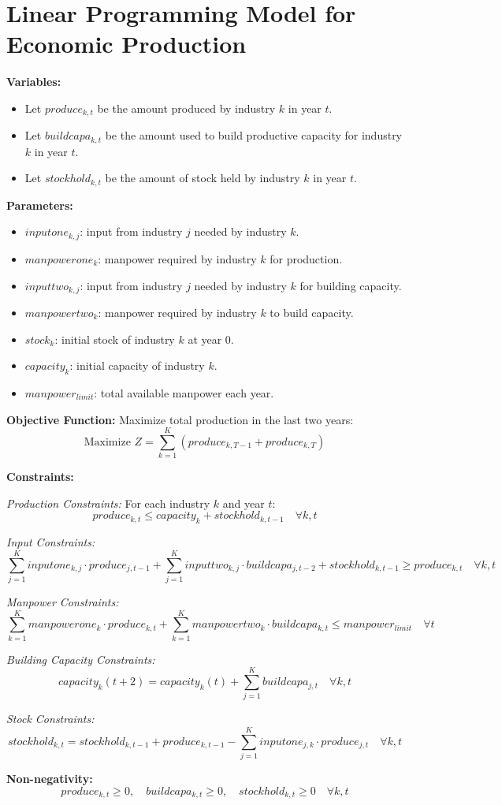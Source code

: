 \documentclass{article}
\begin{document}
\section*{Linear Programming Model for Economic Production}

\textbf{Variables:}
\begin{itemize}
    \item Let \( produce_{k, t} \) be the amount produced by industry \( k \) in year \( t \).
    \item Let \( buildcapa_{k, t} \) be the amount used to build productive capacity for industry \( k \) in year \( t \).
    \item Let \( stockhold_{k, t} \) be the amount of stock held by industry \( k \) in year \( t \).
\end{itemize}

\textbf{Parameters:}
\begin{itemize}
    \item \( inputone_{k,j} \): input from industry \( j \) needed by industry \( k \).
    \item \( manpowerone_k \): manpower required by industry \( k \) for production.
    \item \( inputtwo_{k,j} \): input from industry \( j \) needed by industry \( k \) for building capacity.
    \item \( manpowertwo_k \): manpower required by industry \( k \) to build capacity.
    \item \( stock_k \): initial stock of industry \( k \) at year 0.
    \item \( capacity_k \): initial capacity of industry \( k \).
    \item \( manpower_{limit} \): total available manpower each year.
\end{itemize}

\textbf{Objective Function:}
Maximize total production in the last two years:
\[
\text{Maximize } Z = \sum_{k=1}^K (produce_{k, T-1} + produce_{k, T})
\]

\textbf{Constraints:}

\textit{Production Constraints:}
For each industry \( k \) and year \( t \):
\[
produce_{k, t} \leq capacity_k + stockhold_{k, t-1} \quad \forall k, t
\]

\textit{Input Constraints:}
\[
\sum_{j=1}^K inputone_{k, j} \cdot produce_{j, t-1} + \sum_{j=1}^K inputtwo_{k, j} \cdot buildcapa_{j, t-2} + stockhold_{k, t-1} \geq produce_{k, t} \quad \forall k, t
\]

\textit{Manpower Constraints:}
\[
\sum_{k=1}^K manpowerone_k \cdot produce_{k, t} + \sum_{k=1}^K manpowertwo_k \cdot buildcapa_{k, t} \leq manpower_{limit} \quad \forall t
\]

\textit{Building Capacity Constraints:}
\[
capacity_k(t+2) = capacity_k(t) + \sum_{j=1}^{K} buildcapa_{j, t} \quad \forall k, t
\]

\textit{Stock Constraints:}
\[
stockhold_{k, t} = stockhold_{k, t-1} + produce_{k, t-1} - \sum_{j = 1}^{K} inputone_{j,k} \cdot produce_{j,t} \quad \forall k, t
\]

\textbf{Non-negativity:}
\[
produce_{k, t} \geq 0, \quad buildcapa_{k, t} \geq 0, \quad stockhold_{k, t} \geq 0 \quad \forall k, t
\]
\end{document}
